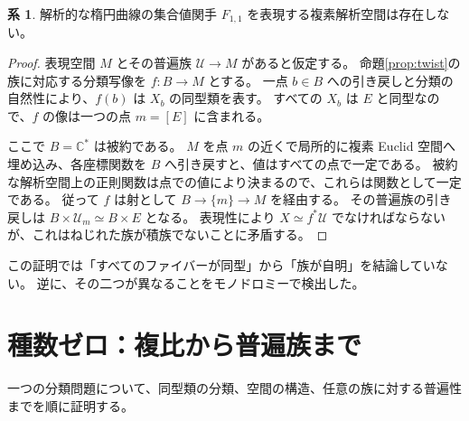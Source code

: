 \documentclass[dvipdfmx,a4paper,11pt]{article}
\theoremstyle{definition}
\newtheorem{cor}[thm]{系}
\newenvironment{aim}{\begin{tcolorbox}[mybox,colback=green!3,title=この章で考えること,fonttitle=\bfseries]}{\end{tcolorbox}}
\newcommand{\C}{\mathbb C}\newcommand{\R}{\mathbb R}\newcommand{\Z}{\mathbb Z}\newcommand{\Q}{\mathbb Q}
\begin{document}
\begin{cor}
解析的な楕円曲線の集合値関手 $F_{1,1}$ を表現する複素解析空間は存在しない。
\end{cor}
\begin{proof}
表現空間 $M$ とその普遍族 $\mathscr U\to M$ があると仮定する。
命題\ref{prop:twist}の族に対応する分類写像を $f:B\to M$ とする。
一点 $b\in B$ への引き戻しと分類の自然性により、$f(b)$ は $X_b$ の同型類を表す。
すべての $X_b$ は $E$ と同型なので、$f$ の像は一つの点 $m=[E]$ に含まれる。

ここで $B=\C^*$ は被約である。
$M$ を点 $m$ の近くで局所的に複素 Euclid 空間へ埋め込み、各座標関数を $B$ へ引き戻すと、値はすべての点で一定である。
被約な解析空間上の正則関数は点での値により決まるので、これらは関数として一定である。
従って $f$ は射として $B\to\{m\}\to M$ を経由する。
その普遍族の引き戻しは $B\times\mathscr U_m\simeq B\times E$ となる。
表現性により $X\simeq f^*\mathscr U$ でなければならないが、これはねじれた族が積族でないことに矛盾する。
\end{proof}
この証明では「すべてのファイバーが同型」から「族が自明」を結論していない。
逆に、その二つが異なることをモノドロミーで検出した。

\par\bigskip\Needspace{.70\textheight}
\section{種数ゼロ：複比から普遍族まで}\label{sec:g0}
\begin{aim}
一つの分類問題について、同型類の分類、空間の構造、任意の族に対する普遍性までを順に証明する。
\end{aim}
\end{document}
